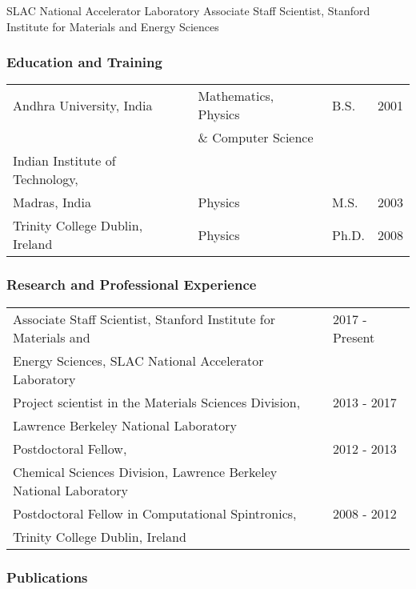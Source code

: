 SLAC National Accelerator Laboratory Associate Staff Scientist, Stanford Institute for Materials and Energy Sciences

\subsubsection*{Education and Training}

\begin{table}[ht]
    \centering
    \begin{tabular}{llll}
       Andhra University, India  & Mathematics, Physics & B.S. & 2001 \\
       & \& Computer Science & & \\
        Indian Institute of Technology, & & &\\
        Madras, India & Physics & M.S. & 2003 \\
        Trinity College Dublin, Ireland & Physics & Ph.D. & 2008 \\
    \end{tabular}
\end{table}

\subsubsection*{Research and Professional Experience}

\begin{table}[ht]
    \centering
    \begin{tabular}{ll}
       Associate Staff Scientist, Stanford Institute for Materials and & 2017 - Present   \\
      Energy Sciences, SLAC National Accelerator Laboratory & \\
      Project scientist in the Materials Sciences Division, & 2013 - 2017 \\
      Lawrence Berkeley National Laboratory & \\
      Postdoctoral Fellow, & 2012 - 2013 \\
      Chemical Sciences Division, Lawrence Berkeley National Laboratory & \\
        Postdoctoral Fellow in Computational Spintronics, & 2008 - 2012 \\
        Trinity College Dublin, Ireland & \\
    \end{tabular}
\end{table}

\subsubsection*{Publications}

